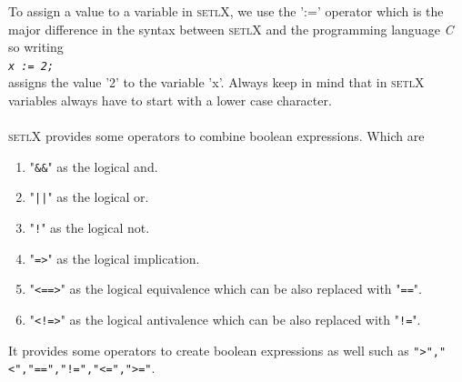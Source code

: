 \documentclass[11pt]{report}
\begin{document}
To assign a value to a variable in \textsc{setlX}, we use the ':=' operator which is the major difference in the syntax between \textsc{setlX} and the programming language \textsl{C}
so writing 
\\[0.2cm]
\hspace*{1.3cm}
\texttt{\textsl{x := 2;}}
\\[0.2cm]
assigns the value '2' to the variable 'x'. Always keep in mind that in \textsc{setlX} variables always have to start with a lower case character.
\\
\\
\textsc{setlX} provides some operators to combine boolean expressions. Which are
\begin{enumerate}
\item "\texttt{\&\&}" as the logical and.
\item "\texttt{||}" as the logical or.
\item "\texttt{!}" as the logical not.
\item "\texttt{=>}" as the logical implication.
\item "\texttt{<==>}" as the logical equivalence which can be also replaced with "\texttt{==}".
\item "\texttt{<!=>}" as the logical antivalence which can be also replaced with "\texttt{!=}".
\end{enumerate}
It provides some operators to create boolean expressions as well such as \texttt{">","<","==","!=","<=",">="}.
\end{document}

